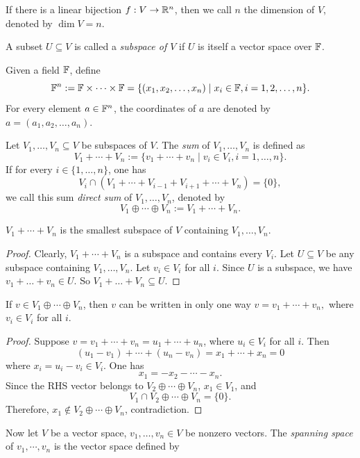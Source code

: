 If there is a linear bijection $f: V \to \mathbb{R}^n$, then we call $n$ the dimension of $V$, denoted by $\dim V = n$. 

A subset $U \subseteq V$ is called a \textit{subspace of $V$} if $U$ is itself a vector space over $\mathbb{F}$.

Given a field $\mathbb{F}$, define 
\[
  \mathbb{F}^n := \mathbb{F}\times \cdots \times \mathbb{F} = \{(x_1, x_2, \ldots, x_n) \mid x_i \in \mathbb{F}, i=1,2,\ldots,n\}.
\]
For every element $a \in \mathbb{F}^n$, the coordinates of $a$ are denoted by $a = (a_1, a_2, \ldots, a_n)$. 

Let $V_1,\dots, V_n \subseteq V$ be subspaces of $V$. The \textit{sum} of $V_1,\dots, V_n$ is defined as
\[
  V_1 + \cdots + V_n := \{v_1 + \cdots + v_n \mid v_i \in V_i, i=1,\dots,n\}. 
\]
If for every $i\in\{1,\ldots,n\}$, one has 
\[V_i \cap \left(V_1 + \cdots + V_{i - 1} + V_{i +1 } + \cdots + V_n\right) = \{0\},\] we call this sum \textit{direct sum} of $V_1,\dots, V_n$, denoted by 
\[
  V_1 \oplus \cdots \oplus V_n := V_1 + \cdots + V_n.
\]
\begin{proposition}
  $V_1 + \cdots + V_n$ is the smallest subspace of $V$ containing $V_1,\dots, V_n$.
\end{proposition}
\begin{proof}
  Clearly, $V_1 + \cdots + V_n$ is a subspace and contains every $V_i$. Let $U \subseteq V$ be any subspace containing $V_1,\dots, V_n$. Let $v_i \in V_i$ for all $i$. Since $U$ is a subspace, we have $v_1 + \dots + v_n \in U$. So $V_1 + \dots + V_n \subseteq U$. 
\end{proof}
\begin{proposition}
  If $v \in V_1 \oplus \cdots \oplus V_n$, then $v$ can be written in only one way 
  $
    v = v_1 + \cdots + v_n,
  $
  where $v_i \in V_i$ for all $i$.
\end{proposition}
\begin{proof}
  Suppose $v = v_1 + \cdots + v_n = u_1 + \cdots + u_n$, where $u_i \in V_i$ for all $i$. Then 
  \[  
   (u_1 - v_1) + \cdots + (u_n - v_n) = x_1 + \cdots + x_n = 0
  \]
  where $x_i = u_i - v_i \in V_i$. One has 
  \[
    x_1 = -x_2 - \cdots - x_n.
  \]
  Since the RHS vector belongs to $V_{2} \oplus \cdots \oplus V_n$, $x_{1} \in V_{1}$, and \[V_{1} \cap V_{2} \oplus \cdots \oplus V_n = \{0\}.\] Therefore, $x_{1} \notin V_{2} \oplus \cdots \oplus V_n$, contradiction.
\end{proof}
Now let $V$ be a vector space, $v_1,\dots, v_n \in V$ be nonzero vectors. The \textit{spanning space} of $v_1,\cdots, v_n$ is the vector space defined by
